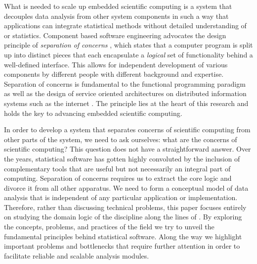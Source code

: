 What is needed to scale up embedded scientific computing is a system that decouples data analysis from other system components in such a way that applications can integrate statistical methods without detailed understanding of \R or statistics. Component based software engineering advocates the design principle of \emph{separation of concerns} \citep{heineman2001component}, which states that a computer program is split up into distinct pieces that each encapsulate a \emph{logical} set of functionality behind a well-defined interface. This allows for independent development of various components by different people with different background and expertise. Separation of concerns is fundamental to the functional programming paradigm \citep{reade1989elements} as well as the design of service oriented architectures on distributed information systems such as the internet \citep{fielding2000architectural}. The principle lies at the heart of this research and holds the key to advancing embedded scientific computing.

In order to develop a system that separates concerns of scientific computing from other parts of the system, we need to ask ourselves: what are the concerns of scientific computing? This question does not have a straightforward answer. Over the years, statistical software has gotten highly convoluted by the inclusion of complementary tools that are useful but not necessarily an integral part of computing. Separation of concerns requires us to extract the core logic and divorce it from all other apparatus. We need to form a conceptual model of data analysis that is independent of any particular application or implementation. Therefore, rather than discussing technical problems, this paper focuses entirely on studying the domain logic of the discipline along the lines of \cite{evans2004domain}. By exploring the concepts, problems, and practices of the field we try to unveil the fundamental principles behind statistical software. Along the way we highlight important problems and bottlenecks that require further attention in order to facilitate reliable and scalable analysis modules.


